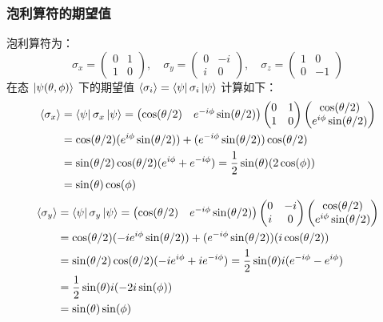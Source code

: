 \documentclass[12pt, a4paper]{article}
\begin{document}
\subsubsection*{泡利算符的期望值}
泡利算符为：
\[
\sigma_x = \begin{pmatrix} 0 & 1 \\ 1 & 0 \end{pmatrix}, \quad
\sigma_y = \begin{pmatrix} 0 & -i \\ i & 0 \end{pmatrix}, \quad
\sigma_z = \begin{pmatrix} 1 & 0 \\ 0 & -1 \end{pmatrix}
\]
在态 \(\ket{\psi(\theta, \phi)}\) 下的期望值 \(\expval{\sigma_i} = \bra{\psi} \sigma_i \ket{\psi}\) 计算如下：
\begin{align*}
\expval{\sigma_x} &= \bra{\psi} \sigma_x \ket{\psi} = \begin{pmatrix} \cos(\theta/2) & e^{-i\phi} \sin(\theta/2) \end{pmatrix} \begin{pmatrix} 0 & 1 \\ 1 & 0 \end{pmatrix} \begin{pmatrix} \cos(\theta/2) \\ e^{i\phi} \sin(\theta/2) \end{pmatrix} \\
&= \cos(\theta/2) (e^{i\phi} \sin(\theta/2)) + (e^{-i\phi} \sin(\theta/2)) \cos(\theta/2) \\
&= \sin(\theta/2)\cos(\theta/2) (e^{i\phi} + e^{-i\phi}) = \frac{1}{2} \sin(\theta) (2\cos(\phi)) \\
&= \sin(\theta) \cos(\phi)
\end{align*}
\begin{align*}
\expval{\sigma_y} &= \bra{\psi} \sigma_y \ket{\psi} = \begin{pmatrix} \cos(\theta/2) & e^{-i\phi} \sin(\theta/2) \end{pmatrix} \begin{pmatrix} 0 & -i \\ i & 0 \end{pmatrix} \begin{pmatrix} \cos(\theta/2) \\ e^{i\phi} \sin(\theta/2) \end{pmatrix} \\
&= \cos(\theta/2) (-i e^{i\phi} \sin(\theta/2)) + (e^{-i\phi} \sin(\theta/2)) (i \cos(\theta/2)) \\
&= \sin(\theta/2)\cos(\theta/2) (-i e^{i\phi} + i e^{-i\phi}) = \frac{1}{2} \sin(\theta) i(e^{-i\phi} - e^{i\phi}) \\
&= \frac{1}{2} \sin(\theta) i(-2i \sin(\phi)) \\
&= \sin(\theta) \sin(\phi)
\end{align*}
\end{document}
